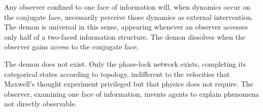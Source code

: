 \documentclass[12pt,a4paper]{article}
\theoremstyle{definition}
\theoremstyle{remark}
\begin{document}
Any observer confined to one face of information will, when dynamics occur on the conjugate face, necessarily perceive those dynamics as external intervention. The demon is universal in this sense, appearing whenever an observer accesses only half of a two-faced information structure. The demon dissolves when the observer gains access to the conjugate face.

The demon does not exist. Only the phase-lock network exists, completing its categorical states according to topology, indifferent to the velocities that Maxwell's thought experiment privileged but that physics does not require. The observer, examining one face of information, invents agents to explain phenomena not directly observable.





\end{document}
